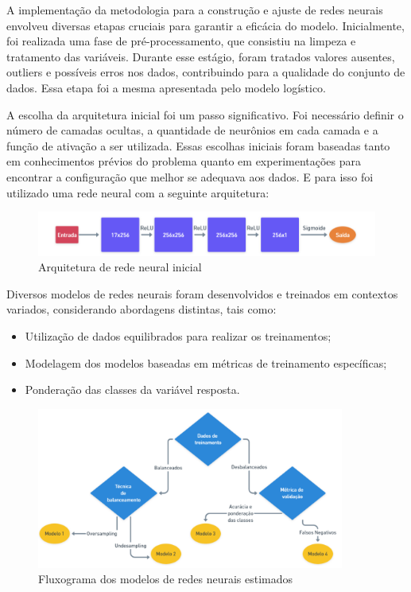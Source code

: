 A implementação da metodologia para a construção e ajuste de redes neurais envolveu diversas etapas cruciais 
para garantir a eficácia do modelo. Inicialmente, foi realizada uma fase de pré-processamento, que consistiu
na limpeza e tratamento das variáveis. Durante esse estágio, foram tratados valores ausentes, outliers e possíveis
erros nos dados, contribuindo para a qualidade do conjunto de dados. Essa etapa foi a mesma apresentada pelo
modelo logístico.

A escolha da arquitetura inicial foi um passo significativo. Foi necessário definir o número de camadas ocultas,
a quantidade de neurônios em cada camada e a função de ativação a ser utilizada. Essas escolhas iniciais foram 
baseadas tanto em conhecimentos prévios do problema quanto em experimentações para encontrar a configuração que 
melhor se adequava aos dados. 
E para isso foi utilizado uma rede neural com a seguinte arquitetura:

\begin{figure}[H]
  \centering
  \includegraphics[width=1\textwidth]{imagens/arc_rede_neural.png}
  \caption{Arquitetura de rede neural inicial}
  \label{fig:imagens/arc_rede_neural.png}
\end{figure}


Diversos modelos de redes neurais foram desenvolvidos e treinados em contextos variados, considerando abordagens distintas, tais como:

\begin{itemize}
  \item Utilização de dados equilibrados para realizar os treinamentos;
  \item Modelagem dos modelos baseadas em métricas de treinamento específicas;
  \item Ponderação das classes da variável resposta.
\end{itemize}

\begin{figure}[H]
  \centering
  \includegraphics[width=0.9\textwidth]{imagens/fluxograma_selecao_modelo_neural.png}
  \caption{Fluxograma dos modelos de redes neurais estimados}
  \label{fig:imagens/fluxograma_selecao_modelo_neural.png}
\end{figure}



